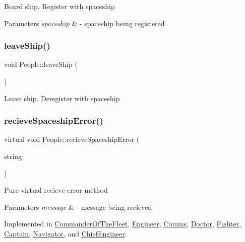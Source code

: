 Board ship. Register with spaceship 
\begin{DoxyParams}{Parameters}
{\em spaceship} & -\/ spaceship being registered \\
\hline
\end{DoxyParams}
\mbox{\label{classPeople_a5e87ed1cfd4d4d90b95e3b2196c7687e}} 
\subsubsection{\texorpdfstring{leave\+Ship()}{leaveShip()}}
{\footnotesize\ttfamily void People\+::leave\+Ship (\begin{DoxyParamCaption}{ }\end{DoxyParamCaption})}

Leave ship. Deregister with spaceship \mbox{\label{classPeople_a0685df78be631783138865e03cc7c85d}} 
\subsubsection{\texorpdfstring{recieve\+Spaceship\+Error()}{recieveSpaceshipError()}}
{\footnotesize\ttfamily virtual void People\+::recieve\+Spaceship\+Error (\begin{DoxyParamCaption}\item[{string}]{ }\end{DoxyParamCaption})\hspace{0.3cm}{\ttfamily [pure virtual]}}

Pure virtual recieve error method 
\begin{DoxyParams}{Parameters}
{\em message} & -\/ message being recieved \\
\hline
\end{DoxyParams}


Implemented in \hyperlink{classCommanderOfTheFleet_a13e91b9342df067b375f7ef2b929c0d5}{Commander\+Of\+The\+Fleet}, \hyperlink{classEngineer_acc86ce6b4b1388be8ebacc685f9e6233}{Engineer}, \hyperlink{classComms_a1aed1c01a813afd55309fdc59d2871bf}{Comms}, \hyperlink{classDoctor_a820dca3b9f05d3f69c47bd7318923b88}{Doctor}, \hyperlink{classFighter_aecd2761c68aed8499e210fd0ca11c447}{Fighter}, \hyperlink{classCaptain_a39ebd40ec094b410f295188bb6262009}{Captain}, \hyperlink{classNavigator_a7dc06965001f658cff3c5f0dcac39def}{Navigator}, and \hyperlink{classChiefEngineer_a7170ae93d7eadc1a68bc86c25a9be0db}{Chief\+Engineer}.

